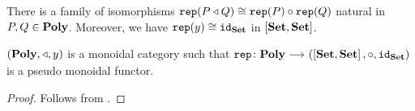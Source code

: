 \documentclass[a4paper,dvipsnames, 11pt]{amsart}
\begin{document}
\begin{lemma}
	\label{lem:PolyMonoidalCaty}
	There is a family of isomorphisms
	$\mathtt{rep}(P\triangleleft Q)\cong\mathtt{rep}(P)\circ\mathtt{rep}(Q)$ natural in $P,Q\in\mathbf{Poly}$.
	Moreover, we have $\mathtt{rep}(y)\cong\mathtt{id}_{\mathbf{Set}}$ in $\left[\mathbf{Set},\mathbf{Set}\right]$.
\end{lemma}
\begin{proposition}
	\label{prop:PolyMonoidalCaty}
	$(\mathbf{Poly},\triangleleft,y)$ is a monoidal category
	such that $\rep\colon\Poly\arr\left(\left[\Set,\Set\right],\circ,\id_\Set\right)$ is a pseudo monoidal functor.
\end{proposition}
\begin{proof}
	Follows from .
\end{proof}



\end{document}
